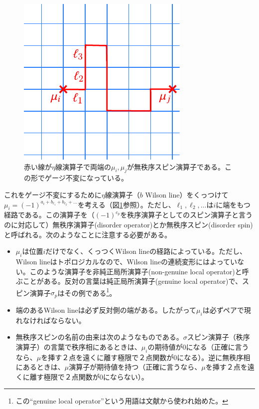 \documentclass[a4paper,12pt,dvipdfmx]{jlreq}
\begin{document}
\begin{figure}[htbp]
  \centering
  \includegraphics{disorder.pdf}
  \caption{赤い線が$\eta$線演算子で両端の$\mu_i,\mu_j$が無秩序スピン演算子である。この形でゲージ不変になっている。}
  \label{fig:disorder}
\end{figure}

これをゲージ不変にするために$\eta$線演算子（$b$ Wilson line）をくっつけて
$\mu_i=(-1)^{a_i+b_{\ell_1}+b_{\ell_2}+\dots}$を考える（図\ref{fig:disorder}参照）。ただし、$\ell_1,\ell_2,\dots$は$i$に端をもつ経路である。この演算子を（$(-1)^{c_p}$を秩序演算子としてのスピン演算子と言うのに対応して）無秩序演算子(disorder operator)とか無秩序スピン(disorder spin)と呼ばれる。次のようなことに注意する必要がある。
\begin{itemize}
  \item $\mu_i$は位置$i$だけでなく、くっつくWilson lineの経路によっている。ただし、Wilson lineはトポロジカルなので、Wilson lineの連続変形にはよっていない。このような演算子を非純正局所演算子(non-genuine local operator)と呼ぶことがある。反対の言葉は純正局所演算子(genuine local operator)で、スピン演算子$\sigma_{p}$はその例である\footnote{この``genuine local operator''という用語は文献\cite{Kapustin:2014gua}から使われ始めた。}。
  \item 端のあるWilson lineは必ず反対側の端がある。したがって$\mu_i$は必ずペアで現れなければならない。
  \item 無秩序スピンの名前の由来は次のようなものである。$\sigma$スピン演算子（秩序演算子）の言葉で秩序相にあるときは、$\mu_i$の期待値が$0$になる（正確に言うなら、$\mu$を挿す２点を遠くに離す極限で２点関数が$0$になる）。逆に無秩序相にあるときは、$\mu$演算子が期待値を持つ（正確に言うなら、$\mu$を挿す２点を遠くに離す極限で２点関数が$0$にならない）。
\end{itemize}
\end{document}
